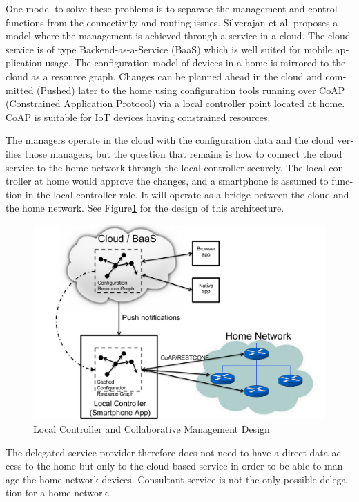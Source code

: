 \documentclass[12pt,a4paper,english]{tutthesis}
\begin{document}
\begin{otherlanguage}{english}
One model to solve these problems is to separate the management and
control functions from the connectivity and routing
issues. Silverajan et al. \cite{silverajan2015collaborative} proposes
a model where the management is achieved through a service in a cloud.
The cloud service is of type Backend-as-a-Service (BaaS) which is well
suited for mobile application usage. The
configuration model of devices in a home is mirrored to the cloud as a
resource graph.
Changes can be planned ahead in the cloud
and committed (Pushed) later to the home  using configuration 
tools 
running over CoAP (Constrained Application Protocol)
via a local controller point located at home.
CoAP is suitable for IoT devices having constrained resources.

The managers operate in the cloud with the configuration data and the
cloud verifies those managers,
but the question that remains is how to connect the cloud service to the home network
through the local controller securely. The local controller at home
would approve the changes, and a smartphone is assumed to function in
the local controller role. It will operate as a bridge between the cloud and the home network.
See Figure\ref{fig:localcontroller} for the design of this architecture.

\begin{figure}[htb]
\centering
\includegraphics[width=.9\linewidth]{localcontroller.png}
\caption{\label{fig:localcontroller}Local Controller and Collaborative Management Design}
\end{figure}



The delegated service provider therefore does not need to have a direct data
access to the home but only to the cloud-based service in order to be able to
manage the home network devices.
Consultant service is not the only possible delegation for a home network.









\end{otherlanguage}
\end{document}
